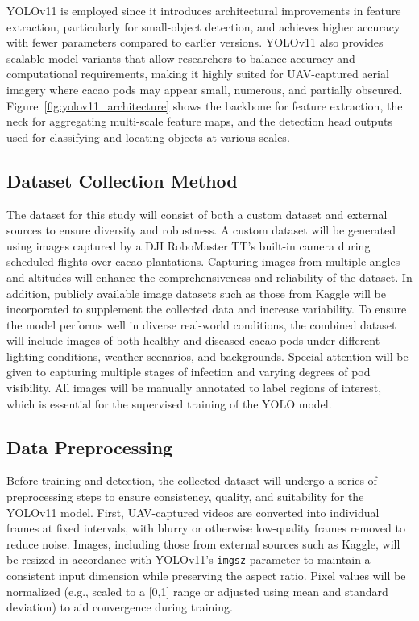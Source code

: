 YOLOv11 is employed since it introduces architectural improvements in feature extraction, particularly for small-object detection, and achieves higher accuracy with fewer parameters compared to earlier versions. YOLOv11 also provides scalable model variants that allow researchers to balance accuracy and computational requirements, making it highly suited for UAV-captured aerial imagery where cacao pods may appear small, numerous, and partially obscured. Figure~\ref{fig:yolov11_architecture} shows the  backbone for feature extraction, the neck for aggregating multi-scale feature maps, and the detection head outputs used for classifying and locating objects at various scales.

\subsection{Dataset Collection Method}
The dataset for this study will consist of both a custom dataset and external sources to ensure diversity and robustness. A custom dataset will be generated using images captured by a DJI RoboMaster TT’s built-in camera during scheduled flights over cacao plantations. Capturing images from multiple angles and altitudes will enhance the comprehensiveness and reliability of the dataset. In addition, publicly available image datasets such as those from Kaggle will be incorporated to supplement the collected data and increase variability. To ensure the model performs well in diverse real-world conditions, the combined dataset will include images of both healthy and diseased cacao pods under different lighting conditions, weather scenarios, and backgrounds. Special attention will be given to capturing multiple stages of infection and varying degrees of pod visibility. All images will be manually annotated to label regions of interest, which is essential for the supervised training of the YOLO model.

\subsection{Data Preprocessing}

Before training and detection, the collected dataset will undergo a series of preprocessing steps to ensure consistency, quality, and suitability for the YOLOv11 model. First, UAV-captured videos are converted into individual frames at fixed intervals, with blurry or otherwise low-quality frames removed to reduce noise. Images, including those from external sources such as Kaggle, will be resized in accordance with YOLOv11's \texttt{imgsz} parameter to maintain a consistent input dimension while preserving the aspect ratio. Pixel values will be normalized (e.g., scaled to a [0,1] range or adjusted using mean and standard deviation) to aid convergence during training.

